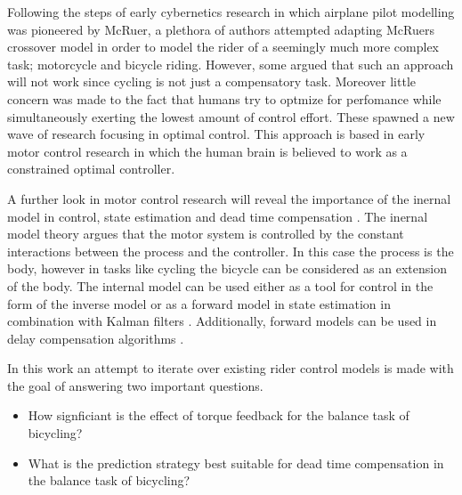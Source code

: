 Following the steps of early cybernetics research in which airplane pilot modelling was pioneered by McRuer\cite{mcruer1959human,mcruer1967manual,mcruer1967manual2}, a plethora of authors attempted adapting McRuers crossover model in order to model the rider of a seemingly much more complex task; motorcycle and bicycle riding. However, some argued that such an approach will not work since cycling is not just a compensatory task. Moreover little concern was made to the fact that humans try to optmize for perfomance while simultaneously exerting the lowest amount of control effort. These spawned a new wave of research focusing in optimal control.  This approach is based in early motor control research in which the human brain is believed to work as a constrained optimal controller. 

A further look in motor control research will reveal the importance of the inernal model in control, state estimation and dead time compensation \cite{francis1976internal, garcia1982internal, wolpert1995internal, gillespie2016human}. The inernal model  theory argues that the motor system is controlled by the constant interactions between the process and the controller. In this case the process is the body, however in tasks like cycling the bicycle can be considered as an extension of the body. The internal model can be used either as a tool for control in the form of the inverse model \cite{edelmann2015,getz1995internal} or as a forward model in state estimation in combination with Kalman filters \cite{wolpert1995internal}. Additionally, forward models can be used in delay compensation algorithms \cite{miall1993cerebellum,van2001adaptive}. 

In this work an attempt to iterate over existing rider control models is made with the goal of answering two important questions. 
\begin{itemize}
        \item How signficiant is the effect of torque feedback for the balance task of bicycling?
        \item What is the prediction strategy best suitable for dead time  compensation in the balance task of bicycling?
\end{itemize}

